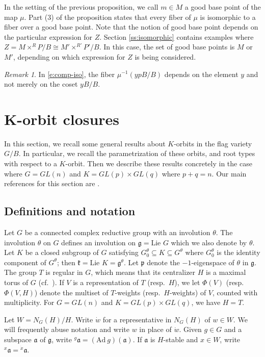 \documentclass[11pt,letterpaper,reqno]{amsart}
\newcommand{\fa}{{\mathfrak a}}
\newcommand{\fg}{{\mathfrak g}}
\newcommand{\fk}{{\mathfrak k}}
\newcommand{\fp}{{\mathfrak p}}
\numberwithin{equation}{section}
\theoremstyle{plain}
\theoremstyle{definition}
\theoremstyle{remark}
\newtheorem{remark}[theorem]{Remark}
\newcommand{\Ad}{\mathrm{Ad}}
\begin{document}
In the setting of the previous proposition, we call $m \in M$ a good base point of the map $\mu$.  Part
(3) of the proposition states that every fiber of $\mu$ is isomorphic to a fiber over a good base point.  Note that
the notion of good base point depends on the particular expression for $Z$.  Section \ref{ss:isomorphic}
contains examples where $Z = M \times^R P/B \cong M' \times^{R'} P'/B$.  In this case, the set of good base points is $M$ or $M'$,
depending on which expression for $Z$ is being considered.


\begin{remark}
In \eqref{e:comp-iso},
the fiber $\mu^{-1}(ypB/B)$ depends on the element
$y$ and not merely on the coset $yB/B$. 
\end{remark}

\section{K-orbit closures} \label{s:background}
In this section, we recall some general results about $K$-orbits in the flag variety $G/B$.  In particular, we recall the parametrization of these orbits, and
 root types with respect to a $K$-orbit.  Then we describe these results concretely
in the case where $G = GL(n)$ and $K = GL(p) \times GL(q)$ where $p+q=n$.  Our main references for this section are \cite{Lar,RS90,RS93,Vog3}.

\subsection{Definitions and notation} \label{ss:definitions}
Let $G$ be a connected complex reductive group with an involution $\theta$.  The involution $\theta$ on $G$ defines an involution on $\mathfrak{g} = \mbox{Lie } G$ which we also denote by $\theta$.  Let $K$ be a closed subgroup of $G$ satisfying
$G^{\theta}_0 \subseteq K \subseteq G^{\theta}$ where $G^{\theta}_0$ is the identity component of  \(G^{\theta}\); then $\fk = \mbox{Lie }K = \fg^{\theta}$.
Let $\fp$ denote the $-1$-eigenspace of $\theta$ in $\fg$.
The group $T$ is regular in $G$, which
means that its centralizer $H$ is a maximal torus of $G$ (cf.\ \cite[2.3]{Brion1999}).   If $V$ is a representation of $T$ (resp.~$H$),
we let $\Phi(V)$ (resp.~$\Phi(V,H)$) denote the multiset of $T$-weights (resp.~$H$-weights) of $V$, counted with multiplicity.
For $G = GL(n)$ and $K = GL(p) \times GL(q)$, we have $H = T$.

Let $W = N_G(H)/H$.  Write $\dot{w}$ for a representative in $N_G(H)$ of $w \in W$.  We will frequently abuse notation
and write $w$ in place of $\dot{w}$.
Given $g \in G$ and a subspace $\fa$ of $\fg$, write ${}^g \fa = (\Ad \ g) (\fa)$.  If $\fa$ is $H$-stable and $x \in W$,  write
${}^x \fa = {}^{\dot{x}} \fa$.
\end{document}
